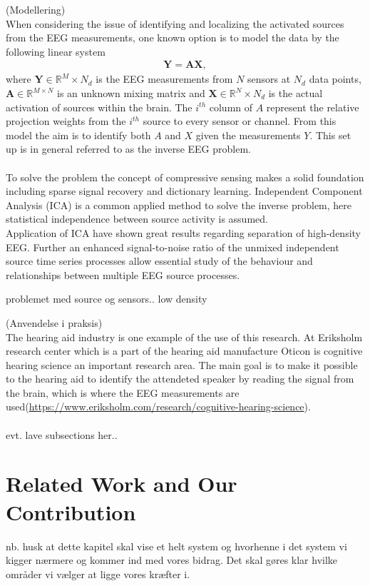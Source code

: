 (Modellering)\\
When considering the issue of identifying and localizing the activated sources from the EEG measurements, one known option is to model the data by the following linear system 
\begin{align*}
\mathbf{Y} = \mathbf{AX},
\end{align*}
where $\mathbf{Y} \in \mathbb{R}^M\times N_d$ is the EEG measurements from $N$ sensors at $N_d$ data points, $\mathbf{A} \in \mathbb{R}^{M \times N}$ is an unknown mixing matrix and $\mathbf{X} \in \mathbb{R}^N \times N_d$ is the actual activation of sources within the brain. The $i^{th}$ column of $A$ represent the relative projection weights from the $i^{th}$ source to every sensor or channel\cite{phd2015}. 
From this model the aim is to identify both $A$ and $X$ given the measurements $Y$. This set up is in general referred to as the inverse EEG problem.  \\
\\
To solve the problem the concept of compressive sensing makes a solid foundation including sparse signal recovery and dictionary learning. Independent Component Analysis (ICA) is a common applied method to solve the inverse problem\cite{Scott1996}\cite{Scott1997}, here statistical independence between source activity is assumed. \\
Application of ICA have shown great results regarding separation of high-density EEG. Further an enhanced signal-to-noise ratio of the unmixed independent source time series processes allow essential study of the behaviour and relationships between multiple EEG source processes\cite{Arnaud2012}.




problemet med source og sensors.. 
low density 

(Anvendelse i praksis)\\
The hearing aid industry is one example of the use of this research. At Eriksholm research center which is a part of the hearing aid manufacture Oticon is cognitive hearing science an important research area. The main goal is to make it possible to the hearing aid to identify the attendeted speaker by reading the signal from the brain, which is where the EEG measurements are used(\url{https://www.eriksholm.com/research/cognitive-hearing-science}). \\
\\


evt. lave subsections her..

\section{Related Work and Our Contribution} 





nb. husk at dette kapitel skal vise et helt system og hvorhenne i det system vi kigger nærmere og kommer ind med vores bidrag. Det skal gøres klar hvilke områder vi vælger at ligge vores kræfter i.  





 
